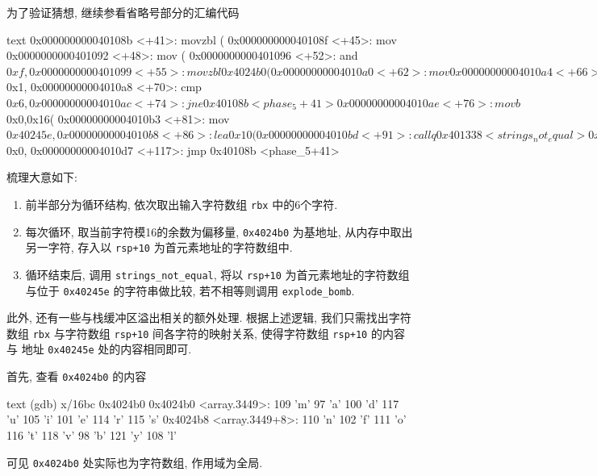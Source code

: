 为了验证猜想, 继续参看省略号部分的汇编代码
\begin{code}{text}
    0x000000000040108b <+41>:    movzbl (%
    0x000000000040108f <+45>:    mov    %
    0x0000000000401092 <+48>:    mov    (%
    0x0000000000401096 <+52>:    and    $0xf,%
    0x0000000000401099 <+55>:    movzbl 0x4024b0(%
    0x00000000004010a0 <+62>:    mov    %
    0x00000000004010a4 <+66>:    add    $0x1,%
    0x00000000004010a8 <+70>:    cmp    $0x6,%
    0x00000000004010ac <+74>:    jne    0x40108b <phase_5+41>
    0x00000000004010ae <+76>:    movb   $0x0,0x16(%
    0x00000000004010b3 <+81>:    mov    $0x40245e,%
    0x00000000004010b8 <+86>:    lea    0x10(%
    0x00000000004010bd <+91>:    callq  0x401338 <strings_not_equal>
    0x00000000004010c2 <+96>:    test   %
    0x00000000004010c4 <+98>:    je     0x4010d9 <phase_5+119>
    0x00000000004010c6 <+100>:   callq  0x40143a <explode_bomb>
    0x00000000004010cb <+105>:   nopl   0x0(%
    0x00000000004010d0 <+110>:   jmp    0x4010d9 <phase_5+119>
    0x00000000004010d2 <+112>:   mov    $0x0,%
    0x00000000004010d7 <+117>:   jmp    0x40108b <phase_5+41>
\end{code}
梳理大意如下:
\begin{enumerate}[noitemsep]
    \item 前半部分为循环结构, 依次取出输入字符数组 \verb|rbx| 中的6个字符.
    \item 每次循环, 取当前字符模16的余数为偏移量, \verb|0x4024b0| 为基地址, 从内存中取出另一字符, 存入以 \verb|rsp+10| 为首元素地址的字符数组中.
    \item 循环结束后, 调用 \verb|strings_not_equal|, 将以 \verb|rsp+10| 为首元素地址的字符数组与位于 \verb|0x40245e| 的字符串做比较, 若不相等则调用 \verb|explode_bomb|.
\end{enumerate}
此外, 还有一些与栈缓冲区溢出相关的额外处理. 根据上述逻辑, 我们只需找出字符数组 \verb|rbx| 与字符数组 \verb|rsp+10| 间各字符的映射关系, 使得字符数组 \verb|rsp+10| 的内容与 地址 \verb|0x40245e| 处的内容相同即可.

首先, 查看 \verb|0x4024b0| 的内容
\begin{code}{text}
(gdb) x/16bc 0x4024b0
0x4024b0 <array.3449>:  109 'm' 97 'a'  100 'd' 117 'u' 105 'i' 101 'e' 114 'r' 115 's'
0x4024b8 <array.3449+8>:        110 'n' 102 'f' 111 'o' 116 't' 118 'v' 98 'b'  121 'y' 108 'l'
\end{code}
可见 \verb|0x4024b0| 处实际也为字符数组, 作用域为全局.

